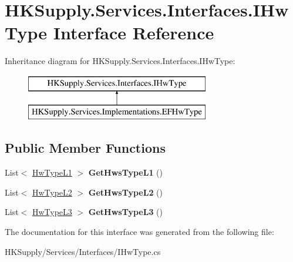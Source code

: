 \hypertarget{interface_h_k_supply_1_1_services_1_1_interfaces_1_1_i_hw_type}{}\section{H\+K\+Supply.\+Services.\+Interfaces.\+I\+Hw\+Type Interface Reference}
\label{interface_h_k_supply_1_1_services_1_1_interfaces_1_1_i_hw_type}
Inheritance diagram for H\+K\+Supply.\+Services.\+Interfaces.\+I\+Hw\+Type\+:\begin{figure}[H]
\begin{center}
\leavevmode
\includegraphics[height=2.000000cm]{interface_h_k_supply_1_1_services_1_1_interfaces_1_1_i_hw_type}
\end{center}
\end{figure}
\subsection*{Public Member Functions}
\begin{DoxyCompactItemize}
\item 
\mbox{\label{interface_h_k_supply_1_1_services_1_1_interfaces_1_1_i_hw_type_a487125374c12f73a42142a072aeac798}} 
List$<$ \mbox{\hyperlink{class_h_k_supply_1_1_models_1_1_hw_type_l1}{Hw\+Type\+L1}} $>$ {\bfseries Get\+Hws\+Type\+L1} ()
\item 
\mbox{\label{interface_h_k_supply_1_1_services_1_1_interfaces_1_1_i_hw_type_a58aad3fff7ec0fc71ae2634a4054fa5e}} 
List$<$ \mbox{\hyperlink{class_h_k_supply_1_1_models_1_1_hw_type_l2}{Hw\+Type\+L2}} $>$ {\bfseries Get\+Hws\+Type\+L2} ()
\item 
\mbox{\label{interface_h_k_supply_1_1_services_1_1_interfaces_1_1_i_hw_type_a325852bd678ea5eb2d2fb30ebf4663a6}} 
List$<$ \mbox{\hyperlink{class_h_k_supply_1_1_models_1_1_hw_type_l3}{Hw\+Type\+L3}} $>$ {\bfseries Get\+Hws\+Type\+L3} ()
\end{DoxyCompactItemize}


The documentation for this interface was generated from the following file\+:\begin{DoxyCompactItemize}
\item 
H\+K\+Supply/\+Services/\+Interfaces/I\+Hw\+Type.\+cs\end{DoxyCompactItemize}
